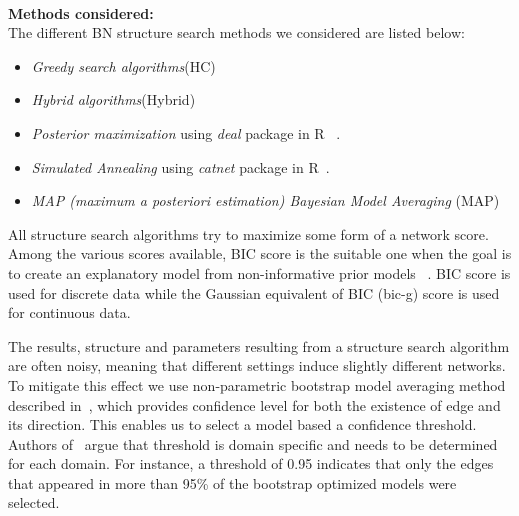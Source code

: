 \documentclass[smallextended]{svjour3}       %
\begin{document}
\noindent\\
\textbf{Methods considered:}\\
The different BN structure search methods we considered are listed below:

\begin{itemize}
\item \textit{Greedy search algorithms}(HC)~\cite{nagarajan2013bayesian,bnppt}
\item \textit{Hybrid algorithms}(Hybrid)~\cite{nagarajan2013bayesian,bnppt}
\item \textit{Posterior maximization} using \textit{deal} package in R~\cite{bnppt,dealR} .
\item \textit{Simulated Annealing} using \textit{catnet} package in R~\cite{catnetR,bnppt}.
\item \textit{MAP (maximum a posteriori estimation) Bayesian Model Averaging} (MAP) ~\cite{nagarajan2013bayesian,bnppt}
\end{itemize}

All structure search algorithms try to maximize some form of a network score. 
Among the various scores available, BIC score is the suitable one when 
the goal is to create an explanatory model from non-informative prior models
~\cite{shmueli2010explain,sober2002instrumentalism}.
BIC score is used for discrete data while the Gaussian 
equivalent of BIC (bic-g) score is used for continuous data.

The results, structure and parameters resulting from a structure
search algorithm are often noisy, meaning that
different settings induce slightly different networks. To mitigate
this effect we use non-parametric bootstrap model averaging method
described in~\cite{friedman1999data}, which provides confidence
level for both the existence of edge and its direction. This enables
us to select a model based a confidence threshold. Authors
of~\cite{friedman1999data} argue that threshold is domain specific
and needs to be determined for each domain. For instance, a threshold of 
 0.95 indicates that  only the edges that appeared in more than
 95\% of the bootstrap optimized models were selected. 
 
\end{document}
